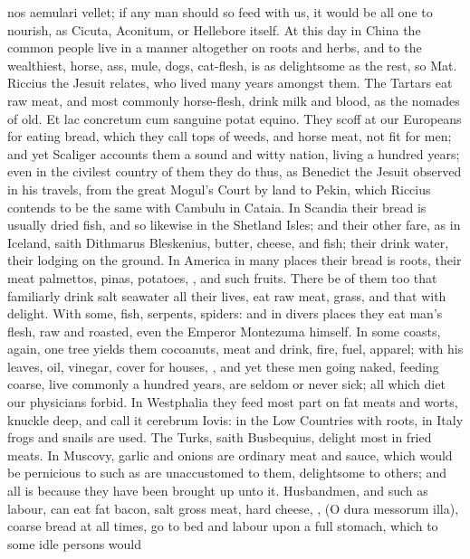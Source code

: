 {nos aemulari vellet; if any man should so feed with us, it would be all
one to nourish, as Cicuta, Aconitum, or Hellebore itself. At this day
in China the common people live in a manner altogether on roots and
herbs, and to the wealthiest, horse, ass, mule, dogs, cat-flesh, is as
delightsome as the rest, so Mat. Riccius the Jesuit relates, who
lived many years amongst them. The Tartars eat raw meat, and most
commonly horse-flesh, drink milk and blood, as the nomades of
old. Et lac concretum cum sanguine potat equino. They scoff at our
Europeans for eating bread, which they call tops of weeds, and horse
meat, not fit for men; and yet Scaliger accounts them a sound and witty
nation, living a hundred years; even in the civilest country of them
they do thus, as Benedict the Jesuit observed in his travels, from the
great Mogul's Court by land to Pekin, which Riccius contends to be the
same with Cambulu in Cataia. In Scandia their bread is usually dried
fish, and so likewise in the Shetland Isles; and their other fare, as
in Iceland, saith Dithmarus Bleskenius, butter, cheese, and fish;
their drink water, their lodging on the ground. In America in many
places their bread is roots, their meat palmettos, pinas, potatoes,
\etc{}, and such fruits. There be of them too that familiarly drink
salt seawater all their lives, eat raw meat, grass, and
that with delight. With some, fish, serpents, spiders: and in divers
places they eat man's flesh, raw and roasted, even the Emperor
Montezuma himself. In some coasts, again, one tree yields
them cocoanuts, meat and drink, fire, fuel, apparel; with his leaves,
oil, vinegar, cover for houses, \etc{}, and yet these men going naked,
feeding coarse, live commonly a hundred years, are seldom or never
sick; all which diet our physicians forbid. In Westphalia they feed
most part on fat meats and worts, knuckle deep, and call it
cerebrum Iovis: in the Low Countries with roots, in Italy frogs
and snails are used. The Turks, saith Busbequius, delight most in fried
meats. In Muscovy, garlic and onions are ordinary meat and sauce, which
would be pernicious to such as are unaccustomed to them, delightsome to
others; and all is because they have been brought up unto it.
Husbandmen, and such as labour, can eat fat bacon, salt gross meat,
hard cheese, \etc{}, (O dura messorum illa), coarse bread at all times, go
to bed and labour upon a full stomach, which to some idle persons would
}
